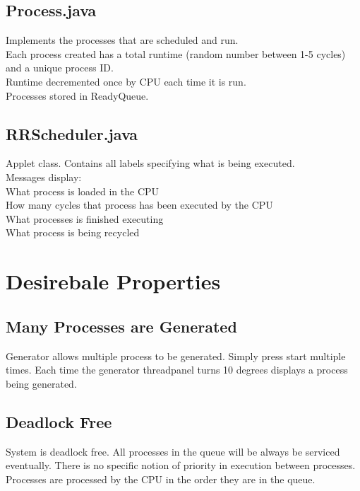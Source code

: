 \documentclass[]{article}
\begin{document}
\subsection*{Process.java}
Implements the processes that are scheduled and run. \\
Each process created has a total runtime (random number between 1-5 cycles) and a unique process ID. \\
Runtime decremented once by CPU each time it is run. \\
Processes stored in ReadyQueue. \\ 

\vspace{2mm}

\subsection*{RRScheduler.java}
Applet class. Contains all labels specifying what is being executed. \\
Messages display: \\
What process is loaded in the CPU \\
How many cycles that process has been executed by the CPU \\
What processes is finished executing \\
What process is being recycled \\

\vspace{2mm}

\section*{Desirebale Properties}
\subsection*{Many Processes are Generated}
Generator allows multiple process to be generated. Simply press start multiple times. Each time the generator threadpanel turns 10 degrees displays a process being generated. \\

\vspace{2mm}

\subsection*{Deadlock Free}
System is deadlock free. All processes in the queue will be always be serviced eventually. There is no specific notion of priority in execution between processes. Processes are processed by the CPU in the order they are in the queue. 
\end{document}

